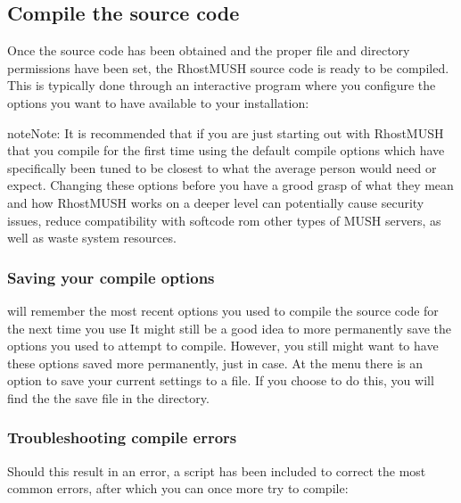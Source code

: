 \documentclass[letterpaper,10pt,english]{sphinxmanual}
\begin{document}
\subsection{Compile the source code}
\label{\detokenize{install:compile-the-source-code}}
\sphinxAtStartPar
Once the source code has been obtained and the proper file and directory
permissions have been set, the RhostMUSH source code is ready to be compiled.
This is typically done through an interactive program where you configure the
options you want to have available to your installation:

\begin{sphinxVerbatim}[commandchars=\\\{\}]
 
\end{sphinxVerbatim}

\begin{sphinxadmonition}{note}{Note:}
\sphinxAtStartPar
It is recommended that if you are just starting out with RhostMUSH that you
compile for the first time using the default compile options which have
specifically been tuned to be closest to what the average person would need
or expect. Changing these options before you have a grood grasp of what
they mean and how RhostMUSH works on a deeper level can potentially cause
security issues, reduce compatibility with softcode rom other types of MUSH
servers, as well as waste system resources.
\end{sphinxadmonition}


\subsubsection{Saving your compile options}
\label{\detokenize{install:saving-your-compile-options}}
\sphinxAtStartPar
{} will remember the most recent options you used to compile
the source code for the next time you use  It might still
be a good idea to more permanently save the options you used to attempt to
compile. However, you still might want to have these options saved more
permanently, just in case. At the  menu there is an
option to save your current settings to a file. If you choose to do this,
you will find the the save file in the  directory.


\subsubsection{Troubleshooting compile errors}
\label{\detokenize{install:troubleshooting-compile-errors}}
\sphinxAtStartPar
Should this result in an error, a script has been included to correct the most
common errors, after which you can once more try to compile:
\end{document}
